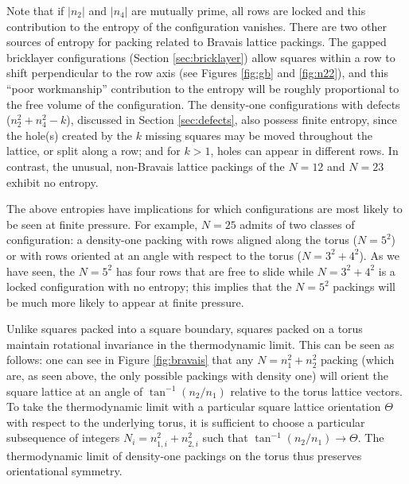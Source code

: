 \documentclass[preprint,aps]{revtex4}
\begin{document}
Note that if $|n_2|$ and $|n_4|$ are mutually prime, all rows are locked and this contribution to the entropy of the configuration vanishes. There are two other sources of entropy for packing related to Bravais lattice packings. The gapped bricklayer configurations (Section \ref{sec:bricklayer}) allow squares within a row to shift perpendicular to the row axis (see Figures \ref{fig:gb} and \ref{fig:n22}), and this ``poor workmanship'' contribution to the entropy will be roughly proportional to the free volume of the configuration.  The density-one configurations with defects ($n_2^2+n_4^2-k$), discussed in Section \ref{sec:defects}, also possess finite entropy, since the hole(s) created by the $k$ missing squares may be moved throughout the lattice, or split along a row; and for $k>1$, holes can appear in different rows.
In contrast, the unusual, non-Bravais lattice packings of the  $N=12$ and $N=23$ exhibit no entropy.







The above entropies have implications for which configurations are most likely to be seen at finite pressure. For example, $N=25$ admits of two classes of configuration:  a density-one packing with rows aligned along the torus ($N=5^2$) or with rows oriented at an angle with respect to the torus ($N=3^2+4^2$).  As we have seen, the $N=5^2$ has four rows that are free to slide while $N=3^2 + 4^2$ is a locked configuration with no entropy; this implies that the $N=5^2$ packings will be much more likely to appear at finite pressure.

Unlike squares packed into a square boundary, squares packed on a torus maintain rotational invariance in the thermodynamic limit.  This can be seen as follows: one can see in Figure \ref{fig:bravais} that any $N=n_1^2+n_2^2$ packing (which are, as seen above, the only possible packings with density one) will orient the square lattice at an angle of $\tan^{-1}(n_2/n_1)$ relative to the torus lattice vectors.  To take the thermodynamic limit with a particular square lattice orientation $\Theta$ with respect to the underlying torus, it is sufficient to choose a particular subsequence of integers $N_i=n_{1,i}^2+n_{2,i}^2$ such that 
$\tan^{-1}(n_2/n_1) \rightarrow \Theta$.
The thermodynamic limit of density-one packings on the torus thus preserves orientational symmetry.
\end{document}
